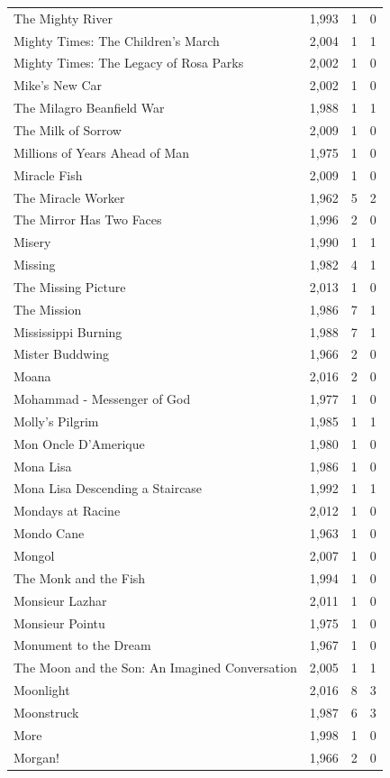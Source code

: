 \begin{tabular}{lrrr}
The Mighty River & 1,993 & 1 & 0 \\
Mighty Times: The Children's March & 2,004 & 1 & 1 \\
Mighty Times: The Legacy of Rosa Parks & 2,002 & 1 & 0 \\
Mike's New Car & 2,002 & 1 & 0 \\
The Milagro Beanfield War & 1,988 & 1 & 1 \\
The Milk of Sorrow & 2,009 & 1 & 0 \\
Millions of Years Ahead of Man & 1,975 & 1 & 0 \\
Miracle Fish & 2,009 & 1 & 0 \\
The Miracle Worker & 1,962 & 5 & 2 \\
The Mirror Has Two Faces & 1,996 & 2 & 0 \\
Misery & 1,990 & 1 & 1 \\
Missing & 1,982 & 4 & 1 \\
The Missing Picture & 2,013 & 1 & 0 \\
The Mission & 1,986 & 7 & 1 \\
Mississippi Burning & 1,988 & 7 & 1 \\
Mister Buddwing & 1,966 & 2 & 0 \\
Moana & 2,016 & 2 & 0 \\
Mohammad - Messenger of God & 1,977 & 1 & 0 \\
Molly's Pilgrim & 1,985 & 1 & 1 \\
Mon Oncle D'Amerique & 1,980 & 1 & 0 \\
Mona Lisa & 1,986 & 1 & 0 \\
Mona Lisa Descending a Staircase & 1,992 & 1 & 1 \\
Mondays at Racine & 2,012 & 1 & 0 \\
Mondo Cane & 1,963 & 1 & 0 \\
Mongol & 2,007 & 1 & 0 \\
The Monk and the Fish & 1,994 & 1 & 0 \\
Monsieur Lazhar & 2,011 & 1 & 0 \\
Monsieur Pointu & 1,975 & 1 & 0 \\
Monument to the Dream & 1,967 & 1 & 0 \\
The Moon and the Son: An Imagined Conversation & 2,005 & 1 & 1 \\
Moonlight & 2,016 & 8 & 3 \\
Moonstruck & 1,987 & 6 & 3 \\
More & 1,998 & 1 & 0 \\
Morgan! & 1,966 & 2 & 0 \\

\end{tabular}
